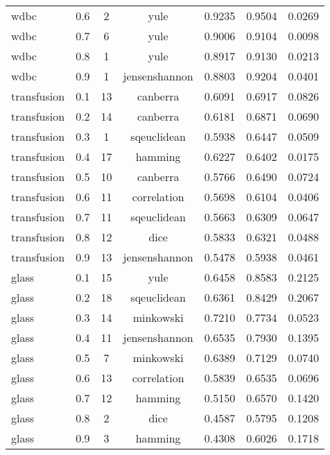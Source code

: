 \begin{table}[ht]
\begin{tabular}{lcccccc}
wdbc & 0.6 & 2 & yule & 0.9235 & 0.9504 & 0.0269 \\
wdbc & 0.7 & 6 & yule & 0.9006 & 0.9104 & 0.0098 \\
wdbc & 0.8 & 1 & yule & 0.8917 & 0.9130 & 0.0213 \\
wdbc & 0.9 & 1 & jensenshannon & 0.8803 & 0.9204 & 0.0401 \\
transfusion & 0.1 & 13 & canberra & 0.6091 & 0.6917 & 0.0826 \\
transfusion & 0.2 & 14 & canberra & 0.6181 & 0.6871 & 0.0690 \\
transfusion & 0.3 & 1 & sqeuclidean & 0.5938 & 0.6447 & 0.0509 \\
transfusion & 0.4 & 17 & hamming & 0.6227 & 0.6402 & 0.0175 \\
transfusion & 0.5 & 10 & canberra & 0.5766 & 0.6490 & 0.0724 \\
transfusion & 0.6 & 11 & correlation & 0.5698 & 0.6104 & 0.0406 \\
transfusion & 0.7 & 11 & sqeuclidean & 0.5663 & 0.6309 & 0.0647 \\
transfusion & 0.8 & 12 & dice & 0.5833 & 0.6321 & 0.0488 \\
transfusion & 0.9 & 13 & jensenshannon & 0.5478 & 0.5938 & 0.0461 \\
glass & 0.1 & 15 & yule & 0.6458 & 0.8583 & 0.2125 \\
glass & 0.2 & 18 & sqeuclidean & 0.6361 & 0.8429 & 0.2067 \\
glass & 0.3 & 14 & minkowski & 0.7210 & 0.7734 & 0.0523 \\
glass & 0.4 & 11 & jensenshannon & 0.6535 & 0.7930 & 0.1395 \\
glass & 0.5 & 7 & minkowski & 0.6389 & 0.7129 & 0.0740 \\
glass & 0.6 & 13 & correlation & 0.5839 & 0.6535 & 0.0696 \\
glass & 0.7 & 12 & hamming & 0.5150 & 0.6570 & 0.1420 \\
glass & 0.8 & 2 & dice & 0.4587 & 0.5795 & 0.1208 \\
glass & 0.9 & 3 & hamming & 0.4308 & 0.6026 & 0.1718 \\
\hline
\end{tabular}
\end{table}